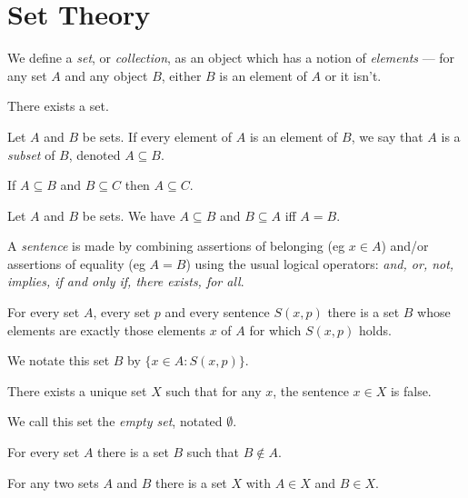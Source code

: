 \section{Set Theory}
\begin{defn}
    We define a \emph{set}, or \emph{collection}, as an object which has a
    notion of \emph{elements} ---
    for any set $A$ and any object $B$, either $B$ is an element of $A$ or it
    isn't.
\end{defn}
\begin{axiom}[Existence]
  There exists a set.
\end{axiom}
\begin{defn}
  Let $A$ and $B$ be sets.
  If every element of $A$ is an element of $B$, we say that $A$ is a
  \emph{subset} of $B$, denoted $A\subseteq B$.
\end{defn}
\begin{prop}
  If $A\subseteq B$ and $B\subseteq C$ then $A\subseteq C$.
\end{prop}
\begin{axiom}[Extensionality]
    Let $A$ and $B$ be sets. We have $A\subseteq B$ and $B\subseteq A$ iff $A=B$.
\end{axiom}
\begin{defn}
  A \emph{sentence} is made by combining assertions of belonging (eg $x\in A$)
  and/or assertions of equality (eg $A=B$) using the usual logical operators:
  \emph{and, or, not, implies, if and only if, there exists, for all}.
\end{defn}
\begin{axiom}[Specification]
  For every set $A$, every set $p$ and every sentence $S(x,p)$ there is a set
  $B$ whose elements are exactly those elements $x$ of $A$ for which $S(x,p)$ 
  holds.
\end{axiom}
\begin{defn}
  We notate this set $B$ by $\{x\in A: S(x,p)\}$.
\end{defn}
\begin{prop}
  There exists a unique set $X$ such that for any $x$, the sentence
  $x\in X$ is false.
\end{prop}
\begin{defn}
  We call this set the \emph{empty set}, notated $\emptyset$.
\end{defn}
\begin{prop}
  For every set $A$ there is a set $B$ such that $B\not\in A$.
\end{prop}
\begin{axiom}[Pairing]
  For any two sets $A$ and $B$ there is a set $X$ with $A\in X$ and $B\in X$.
\end{axiom}
